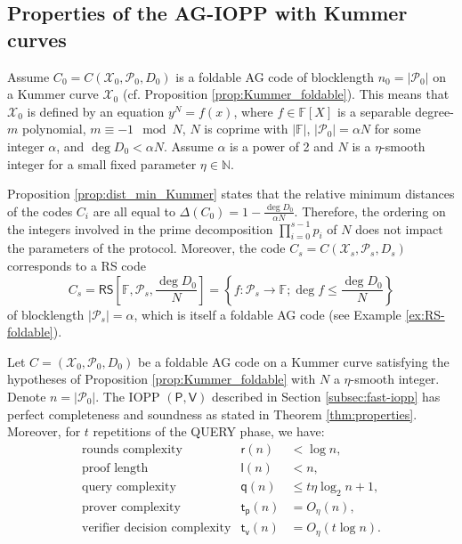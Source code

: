 \documentclass[10pt,a4paper]{article}
\newcommand\F{\mathbb{F}}
\newcommand\RS[1]{\mathsf{RS}\left[\F,#1\right]}
\newcommand\prover{\mathsf{P}}
\newcommand\verifier{\mathsf{V}}
\newcommand{\set}[1]{\left\{#1\right\}}
\newcommand{\size}[1]{\left|#1\right|}
\newcommand\calX{\mathcal{X}}
\newcommand\calP{\mathcal{P}}
\theoremstyle{plain}
\theoremstyle{plain}
\theoremstyle{definition}
\theoremstyle{remark}
\theoremstyle{plain}
\begin{document}
\subsection{Properties of the AG-IOPP with Kummer curves}

Assume $C_0 = C(\calX_0, \calP_0, D_0)$ is a foldable AG code of blocklength $n_0 = \size{\calP_0}$ on a Kummer curve $\calX_0$ (cf. Proposition \ref{prop:Kummer_foldable}). This means that $\calX_0$ is defined by an equation $y^N = f(x)$, where $f \in \F[X]$ is a separable degree-$m$ polynomial, $m \equiv -1 \mod N$, $N$ is coprime with $\size{\F}$, $\size{\calP_0} = \alpha N$ for some integer $\alpha$, and $\deg D_0 < \alpha N$. Assume $\alpha$ is a power of 2 and $N$ is a $\eta$-smooth integer for a small fixed parameter $\eta \in \mathbb N$.

Proposition \ref{prop:dist_min_Kummer} states that the relative minimum distances of the codes $C_i$ are all equal to $\Delta(C_0) = 1 - \frac{\deg D_0}{\alpha N}$. Therefore, the ordering on the integers involved in the prime decomposition $\prod_{i = 0}^{s-1}p_i$ of $N$ does not impact the parameters of the protocol. Moreover, the code $C_{s} = C(\calX_{s}, \calP_{s}, D_{s})$ corresponds to a RS code \[
C_{s} = \RS{\calP_{s}, \frac{\deg D_0}{N}} = \set{f : \calP_{s} \rightarrow \F ; \deg f \le \frac{\deg D_0}{N}}
\] of blocklength $\size{\calP_s} = \alpha$, which is itself a foldable AG code (see Example \ref{ex:RS-foldable}). 


\begin{theorem}\label{thm:kummer-properties}
	Let $C= (\calX_0, \calP_0, D_0)$ be a foldable AG code on a Kummer curve satisfying the hypotheses of Proposition \ref{prop:Kummer_foldable} with $N$ a $\eta$-smooth integer. Denote $n = \size{\calP_0}$.
	The IOPP $(\prover, \verifier)$ described in Section \ref{subsec:fast-iopp} has perfect completeness and soundness as stated in Theorem \ref{thm:properties}. Moreover, for $t$ repetitions of the \textsf{QUERY} phase, we have:
	\[
	\begin{array}{lll}
		\text{rounds complexity} &\mathsf{r}(n) &< \log n,\\
		\text{proof length} &\mathsf{l}(n) &< n,\\
		\text{query complexity} &\mathsf{q}(n) &\le t \eta \log_2 n + 1,\\
		\text{prover complexity} &\mathsf{t_p}(n) &= O_{\eta}(n),\\
		\text{verifier decision complexity} & \mathsf{t_v}(n) &= O_{\eta}(t\log n).
	\end{array}
	\]
\end{theorem}
\end{document}
